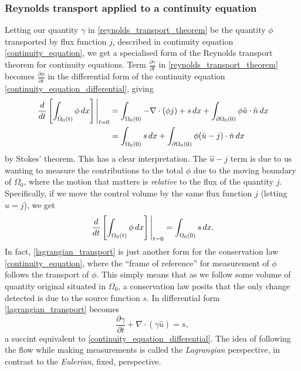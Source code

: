 \documentclass[11pt,a4paper]{memoir}
\newcommand{\Part}[2]{\frac{\partial #1}{\partial #2}}
\begin{document}
\subsubsection{Reynolds transport applied to a continuity equation}
Letting our quantity $\gamma$ in \eqref{reynolds_transport_theorem} be the quantity $\phi$ transported by flux function $j$,
described in continuity equation \eqref{continuity_equation}, we get a specialised form of the Reynolds transport theorem for continuity equations.
Term $\Part{\gamma}{t}$ in \eqref{reynolds_transport_theorem} becomes $\Part{\phi}{t}$ in the differential form of the continuity equation \eqref{continuity_equation_differential}, giving
\begin{equation}\label{reynolds_transport_continuity_equation}
\begin{split}
    \eval{\frac{d}{dt}\left[\int_{\Omega_0(t)}\phi\,dx\right]}_{t=0}
        &= \int_{\Omega_0(0)}-\nabla\cdot(\phi j) + s\,dx + \int_{\partial\Omega_0(0)}\phi \hat{u}\cdot\hat{n} \,dx \\
        &= \int_{\Omega_0(0)}s\,dx + \int_{\partial\Omega_0(0)}\phi (\hat{u} - j)\cdot\hat{n} \,dx
\end{split}
\end{equation}
by Stokes' theorem. This has a clear interpretation.
The $\hat{u} - j$ term is due to us wanting to measure the contributions to the total $\phi$ due to the moving boundary of
$\Omega_0$, where the motion that matters is \textit{relative} to the flux of the quantity $j$. Specifically, if we move the control volume by
the same flux function $j$ (letting $\hat{u} = j$), we get
\begin{equation}\label{lagrangian_transport}
    \eval{\frac{d}{dt}\left[\int_{\Omega_0(t)}\phi\,dx\right]}_{t=0}
        = \int_{\Omega_0(0)}s\,dx.
\end{equation}
In fact, \eqref{lagrangian_transport} is just another form for the conservation law \eqref{continuity_equation},
where the ``frame of reference'' for measurement of $\phi$ follows the transport of $\phi$. This simply means that as we follow some volume of quantity
original situated in $\Omega_0$, a conservation law posits that the only change detected is due to the source function $s$. In differential form
\eqref{lagrangian_transport} becomes
\begin{equation}\label{lagrangian_transport_differential}
    \Part{\gamma}{t} + \nabla \cdot(\gamma \hat{u}) = s,
\end{equation}
a succint equivalent to \eqref{continuity_equation_differential}.
The idea of following the flow while making measurements is called the \textit{Lagrangian} perspective, in contrast to the \textit{Eulerian}, fixed, perspective.
\end{document}

